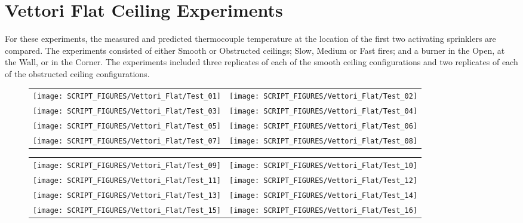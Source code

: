 \clearpage

\section{Vettori Flat Ceiling Experiments}
\label{Vettori_Flat_Results}

For these experiments, the measured and predicted thermocouple temperature at the location of the first two activating sprinklers are compared. The experiments consisted of either Smooth or Obstructed ceilings; Slow, Medium or Fast fires; and a burner in the Open, at the Wall, or in the Corner. The experiments included three replicates of each of the smooth ceiling configurations and two replicates of each of the obstructed ceiling configurations.


\begin{figure}[p]
\begin{tabular*}{\textwidth}{l@{\extracolsep{\fill}}r}
\texttt{[image: SCRIPT\_FIGURES/Vettori\_Flat/Test\_01]} &
\texttt{[image: SCRIPT\_FIGURES/Vettori\_Flat/Test\_02]} \\
\texttt{[image: SCRIPT\_FIGURES/Vettori\_Flat/Test\_03]} &
\texttt{[image: SCRIPT\_FIGURES/Vettori\_Flat/Test\_04]} \\
\texttt{[image: SCRIPT\_FIGURES/Vettori\_Flat/Test\_05]} &
\texttt{[image: SCRIPT\_FIGURES/Vettori\_Flat/Test\_06]} \\
\texttt{[image: SCRIPT\_FIGURES/Vettori\_Flat/Test\_07]} &
\texttt{[image: SCRIPT\_FIGURES/Vettori\_Flat/Test\_08]} \\
\end{tabular*}
\label{Vettori_Plume_Temperature}
\end{figure}

\begin{figure}[p]
\begin{tabular*}{\textwidth}{l@{\extracolsep{\fill}}r}
\texttt{[image: SCRIPT\_FIGURES/Vettori\_Flat/Test\_09]} &
\texttt{[image: SCRIPT\_FIGURES/Vettori\_Flat/Test\_10]} \\
\texttt{[image: SCRIPT\_FIGURES/Vettori\_Flat/Test\_11]} &
\texttt{[image: SCRIPT\_FIGURES/Vettori\_Flat/Test\_12]} \\
\texttt{[image: SCRIPT\_FIGURES/Vettori\_Flat/Test\_13]} &
\texttt{[image: SCRIPT\_FIGURES/Vettori\_Flat/Test\_14]} \\
\texttt{[image: SCRIPT\_FIGURES/Vettori\_Flat/Test\_15]} &
\texttt{[image: SCRIPT\_FIGURES/Vettori\_Flat/Test\_16]} \\
\end{tabular*}
\label{Vettori_2}
\end{figure}

